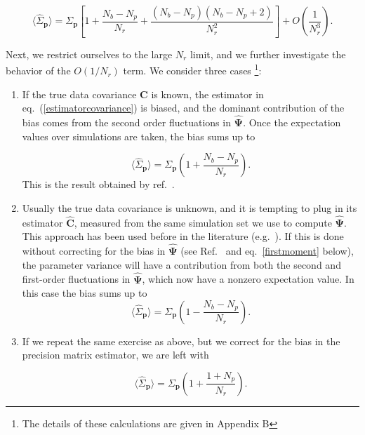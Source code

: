 \documentclass[reprint,aps,prd,superscriptaddress,showkeys,showpacs]{revtex4-1}
\newcommand{\bb}[1]{\mathbf{#1}}
\newcommand{\bbh}[1]{\mathbf{\hat{#1}}}
\newcommand{\h}[1]{\hat{#1}}
\begin{document}
\begin{widetext}
\begin{equation}
\label{quarticdegradation}
\langle\h{\Sigma}_\bb{p}\rangle = \Sigma_\bb{p}\left[1+\frac{N_b-N_p}{N_r}+\frac{(N_b-N_p)(N_b-N_p+2)}{N_r^2}\right] + O\left(\frac{1}{N_r^3}\right).
\end{equation}
\end{widetext}
%
Next, we restrict ourselves to the large $N_r$ limit, and we further
investigate the behavior of the $O(1/N_r)$ term. We consider three
cases \footnote{The details of these calculations are given in Appendix B}:


\begin{enumerate}
\item If the true data covariance $\bb{C}$ is known, the estimator in
  eq.~(\ref{estimatorcovariance}) is biased, and the dominant
  contribution of the bias comes from the second order fluctuations in
  $\bbh{\Psi}$. Once the expectation values over simulations are
  taken, the bias sums up to

\begin{equation}
\label{dodelsonscaling}
\langle\h{\Sigma}_\bb{p}\rangle=\Sigma_\bb{p}\left(1+\frac{N_b-N_p}{N_r}\right).
\end{equation}
%
This is the result obtained by ref.~\citep{DodelsonSchneider13}.

\item Usually the true data covariance is unknown, and it is tempting
  to plug in its estimator $\bbh{C}$, measured from the same
  simulation set we use to compute $\bbh{\Psi}$. This approach has
  been used before in the literature
  (e.g.~\citep{MinkPetri,MinkShirasaki}). If this is done without
  correcting for the bias in $\bbh{\Psi}$ (see Ref.~\citep{Taylor12}
  and eq.~\ref{firstmoment} below), the parameter variance will have a
  contribution from both the second and first-order fluctuations in
  $\bbh{\Psi}$, which now have a nonzero expectation value. In this
  case the bias sums up to
%
\begin{equation}
\label{mockscalinguncorrected}
\langle\h{\Sigma}_\bb{p}\rangle=\Sigma_\bb{p}\left(1-\frac{N_b-N_p}{N_r}\right).
\end{equation}

\item If we repeat the same exercise as above, but we correct for the
  bias in the precision matrix estimator, we are left with

\begin{equation}
\label{mockscalingcorrected}
\langle\h{\Sigma}_\bb{p}\rangle=\Sigma_\bb{p}\left(1+\frac{1+N_p}{N_r}\right).
\end{equation}

\end{enumerate} 
\end{document}
